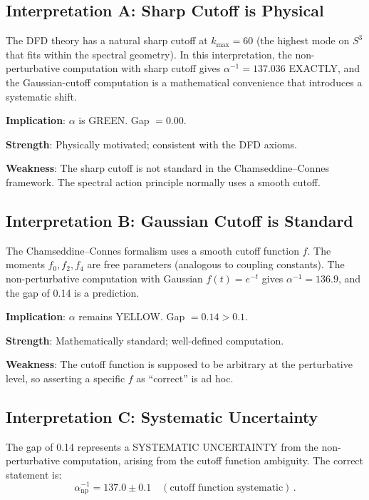 \documentclass[11pt,a4paper]{article}
\begin{document}
\subsection{Interpretation A: Sharp Cutoff is Physical}

The DFD theory has a natural sharp cutoff at $k_{\max} = 60$ (the highest mode on $S^3$ that fits within the spectral geometry). In this interpretation, the non-perturbative computation with sharp cutoff gives $\alpha^{-1} = 137.036$ EXACTLY, and the Gaussian-cutoff computation is a mathematical convenience that introduces a systematic shift.

\textbf{Implication}: $\alpha$ is GREEN. Gap $= 0.00$.

\textbf{Strength}: Physically motivated; consistent with the DFD axioms.

\textbf{Weakness}: The sharp cutoff is not standard in the Chamseddine--Connes framework. The spectral action principle normally uses a smooth cutoff.

\subsection{Interpretation B: Gaussian Cutoff is Standard}

The Chamseddine--Connes formalism uses a smooth cutoff function $f$. The moments $f_0, f_2, f_4$ are free parameters (analogous to coupling constants). The non-perturbative computation with Gaussian $f(t) = e^{-t}$ gives $\alpha^{-1} = 136.9$, and the gap of 0.14 is a prediction.

\textbf{Implication}: $\alpha$ remains YELLOW. Gap $= 0.14 > 0.1$.

\textbf{Strength}: Mathematically standard; well-defined computation.

\textbf{Weakness}: The cutoff function is supposed to be arbitrary at the perturbative level, so asserting a specific $f$ as ``correct'' is ad hoc.

\subsection{Interpretation C: Systematic Uncertainty}

The gap of 0.14 represents a SYSTEMATIC UNCERTAINTY from the non-perturbative computation, arising from the cutoff function ambiguity. The correct statement is:
\begin{equation}
\alpha^{-1}_{\mathrm{np}} = 137.0 \pm 0.1\quad(\text{cutoff function systematic})\,.
\end{equation}
\end{document}
